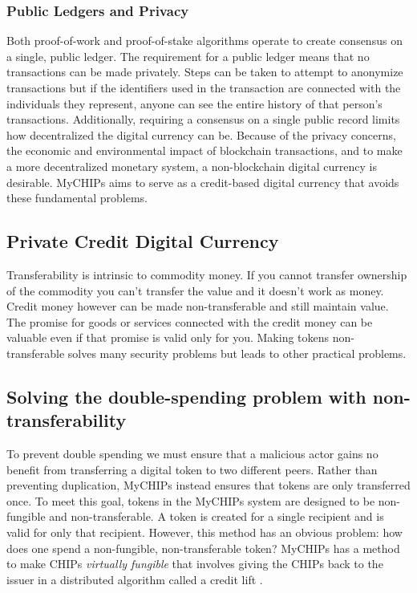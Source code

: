 \documentclass[runningheads]{llncs}
\begin{document}
\subsubsection{Public Ledgers and Privacy}
Both proof-of-work and proof-of-stake algorithms operate to create consensus on a single, public ledger. The requirement for a public ledger means that no transactions can be made privately. Steps can be taken to attempt to anonymize transactions but if the identifiers used in the transaction are connected with the individuals they represent, anyone can see the entire history of that person's transactions. Additionally, requiring a consensus on a single public record limits how decentralized the digital currency can be. Because of the privacy concerns, the economic and environmental impact of blockchain transactions, and to make a more decentralized monetary system, a non-blockchain digital currency is desirable. MyCHIPs aims to serve as a credit-based digital currency that avoids these fundamental problems. 

\subsection{Private Credit Digital Currency}

Transferability is intrinsic to commodity money. If you cannot transfer ownership of the commodity you can't transfer the value and it doesn't work as money. Credit money however can be made non-transferable and still maintain value. The promise for goods or services connected with the credit money can be valuable even if that promise is valid only for you. Making tokens non-transferable solves many security problems but leads to other practical problems.

\subsection{Solving the double-spending problem with non-transferability}
To prevent double spending we must ensure that a malicious actor gains no benefit from transferring a digital token to two different peers. Rather than preventing duplication, MyCHIPs instead ensures that tokens are only transferred once. To meet this goal, tokens in the MyCHIPs system are designed to be non-fungible and non-transferable. A token is created for a single recipient and is valid for only that recipient. However, this method has an obvious problem: how does one spend a non-fungible, non-transferable token? MyCHIPs has a method to make CHIPs \emph{virtually fungible} that involves giving the CHIPs back to the issuer in a distributed algorithm called a credit lift \cite{bateman_myCHIPs}.
\end{document}
